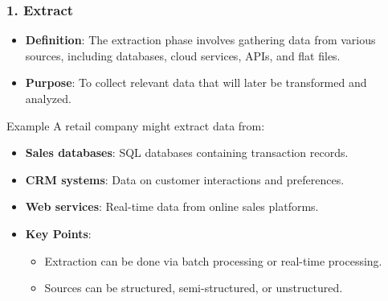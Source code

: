\documentclass[aspectratio=169]{beamer}
\begin{document}
\begin{frame}[fragile]
    \frametitle{1. Extract}
    \begin{itemize}
        \item \textbf{Definition}: The extraction phase involves gathering data from various sources, including databases, cloud services, APIs, and flat files.
        \item \textbf{Purpose}: To collect relevant data that will later be transformed and analyzed.
    \end{itemize}
    
    \begin{block}{Example}
        A retail company might extract data from:
        \begin{itemize}
            \item \textbf{Sales databases}: SQL databases containing transaction records.
            \item \textbf{CRM systems}: Data on customer interactions and preferences.
            \item \textbf{Web services}: Real-time data from online sales platforms.
        \end{itemize}
    \end{block}
    
    \begin{itemize}
        \item \textbf{Key Points}:
        \begin{itemize}
            \item Extraction can be done via batch processing or real-time processing.
            \item Sources can be structured, semi-structured, or unstructured.
        \end{itemize}
    \end{itemize}
\end{frame}
\end{document}

